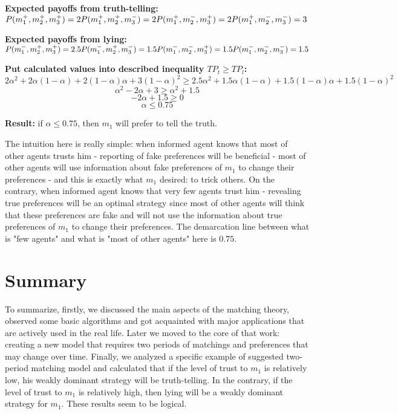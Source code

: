 \documentclass[a4paper]{article} %
\begin{document}
\hfill
\break
\textbf{Expected payoffs from truth-telling:}\\
$P(m_1^+,m_2^+,m_3^+) = 2\\
P(m_1^+,m_2^+,m_3^-) = 2\\
P(m_1^+,m_2^-,m_3^+) = 2\\
P(m_1^+,m_2^-,m_3^-) = 3$

\hfill
\break
\textbf{Expected payoffs from lying:}\\
$P(m_1^-,m_2^+,m_3^+) = 2.5\\
P(m_1^-,m_2^+,m_3^-) = 1.5\\
P(m_1^-,m_2^-,m_3^+) = 1.5\\
P(m_1^-,m_2^-,m_3^-) = 1.5$

\hfill
\break
\textbf{Put calculated values into described inequality $TP_t \geq TP_l$:}
\[
    2\alpha ^ 2 + 2\alpha(1-\alpha) + 2(1-\alpha)\alpha + 3(1-\alpha)^2 \geq 2.5\alpha ^ 2 + 1.5\alpha(1-\alpha) + 1.5(1-\alpha)\alpha + 1.5(1-\alpha)^2
\]   
\[
    \alpha ^ 2 - 2\alpha + 3 \geq \alpha ^ 2 + 1.5
\]  
\[
    -2\alpha + 1.5  \geq 0
\]    
\[
    \alpha  \leq 0.75
\]

\hfill
\break
\textbf{Result:} if $\alpha  \leq 0.75$, then $m_1$ will prefer to tell the truth.

\hfill
\break
The intuition here is really simple: when informed agent knows that most of other agents trusts him - reporting of fake preferences will be beneficial - most of other agents will use information about fake preferences of $m_1$ to change their preferences - and this is exactly what $m_1$ desired: to trick others. On the contrary, when informed agent knows that very few agents trust him - revealing true preferences will be an optimal strategy since most of other agents will think that these preferences are fake and will not use the information about true preferences of $m_1$ to change their preferences. The demarcation line between what is "few agents" and what is "most of other agents" here is $0.75$.






\section{Summary}
To summarize, firstly, we discussed the main aspects of the matching theory, observed some basic algorithms and got acquainted with major applications that are actively used in the real life. Later we moved to the core of that work: creating a new model that requires two periods of matchings and preferences that may change over time. Finally, we analyzed a specific example of suggested two-period matching model and calculated that if the level of trust to $m_1$ is relatively low, his weakly dominant strategy will be truth-telling. In the contrary, if the level of trust to $m_1$ is relatively high, then lying will be a weakly dominant strategy for $m_1$. These results seem to be logical.
\end{document}

